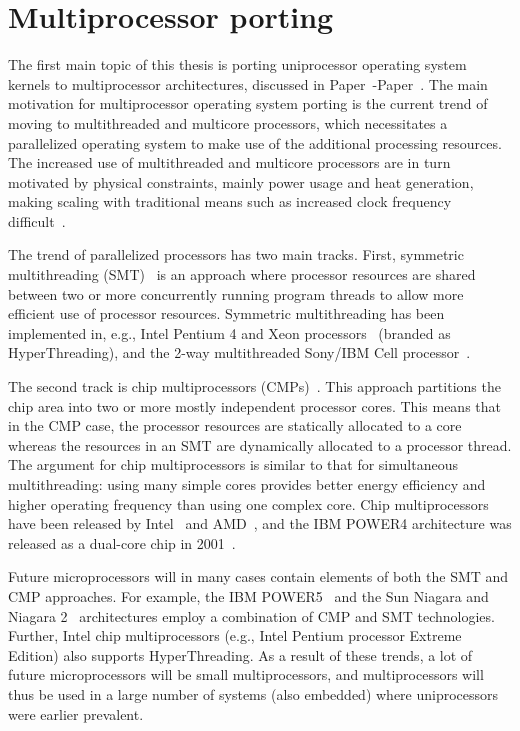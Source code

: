 \section{Multiprocessor porting}
\label{sec:intro:mp}
The first main topic of this thesis is porting uniprocessor operating system
kernels to multiprocessor architectures, discussed in
Paper~-Paper~. The main
motivation for multiprocessor operating system porting is the current trend of
moving to multithreaded and multicore processors, which necessitates a
parallelized operating system to make use of the additional processing
resources. The increased use of multithreaded and multicore processors are in
turn motivated by physical constraints, mainly power usage and heat
generation, making scaling with traditional means such as increased clock
frequency difficult~\cite{mudge01power}.

The trend of parallelized processors has two main tracks. First, symmetric
multithreading (SMT)~\cite{eggers97simultaneous} is an approach where
processor resources are shared between two or more concurrently running
program threads to allow more efficient use of processor resources. Symmetric
multithreading has been implemented in, e.g., Intel Pentium 4 and Xeon
processors~\cite{marr02hyperthreading} (branded as HyperThreading), and the
2-way multithreaded Sony/IBM Cell processor~\cite{pham05cell}.

The second track is chip multiprocessors (CMPs)~\cite{hammond97singlechip}.
This approach partitions the chip area into two or more mostly independent
processor cores. This means that in the CMP case, the processor resources are
statically allocated to a core whereas the resources in an SMT are dynamically
allocated to a processor thread. The argument for chip multiprocessors is
similar to that for simultaneous multithreading: using many simple cores
provides better energy efficiency and higher operating frequency than using
one complex core.  Chip multiprocessors have been released by
Intel~\cite{intel05multicore} and AMD~\cite{amd05multicore}, and the IBM
POWER4 architecture was released as a dual-core chip in
2001~\cite{kahle99power4}.

Future microprocessors will in many cases contain elements of both the SMT and
CMP approaches. For example, the IBM POWER5~\cite{kalla04power5} and the Sun
Niagara and Niagara 2~\cite{kongetira05niagara, johnson07niagara2}
architectures employ a combination of CMP and SMT technologies. Further, Intel
chip multiprocessors (e.g., Intel Pentium processor Extreme Edition) also
supports HyperThreading. As a result of these trends, a lot of future
microprocessors will be small multiprocessors, and multiprocessors will thus
be used in a large number of systems (also embedded) where uniprocessors were
earlier prevalent.


